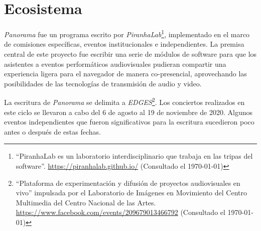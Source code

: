
\section*{Ecosistema}

\textit{Panorama} \citep{panorama} fue un programa escrito por \textit{PiranhaLab}\footnote{``PiranhaLab es un laboratorio interdisciplinario que trabaja en las tripas del software''. \url{https://piranhalab.github.io/} (Consultado el \today)}, implementado en el marco de comisiones específicas, eventos institucionales e independientes. La premisa central de este proyecto fue escribir una serie de módulos de software para que los asistentes a eventos performáticos audiovisuales pudieran compartir una experiencia ligera para el navegador de manera co-presencial, aprovechando las posibilidades de las tecnologías de transmisión de audio y video. %

La escritura de \textit{Panorama} se delimita a \textit{EDGES}\footnote{``Plataforma de experimentación y difusión de proyectos audiovisuales en vivo'' impulsada por el Laboratorio de Imágenes en Movimiento del Centro Multimedia del Centro Nacional de las Artes. \url{https://www.facebook.com/events/209679013466792} (Consultado el \today)}. Los conciertos realizados en este ciclo se llevaron a cabo del 6 de agosto al 19 de noviembre de 2020. Algunos eventos independientes que fueron significativos para la escritura sucedieron poco antes o después de estas fechas. 	





